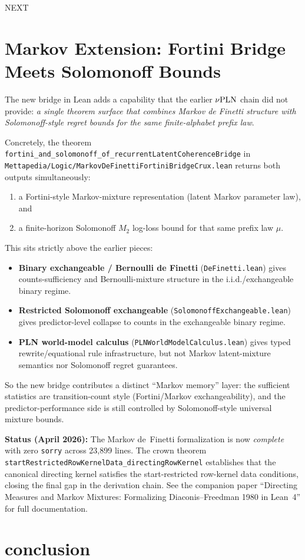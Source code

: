 \documentclass[]{article}
\begin{document}
NEXT

\section{Markov Extension: Fortini Bridge Meets Solomonoff Bounds}
\label{sec:markov-fortini-solomonoff}

The new bridge in Lean adds a capability that the earlier $\nu\textup{PLN}$ chain did not provide:
\emph{a single theorem surface that combines Markov de Finetti structure
with Solomonoff-style regret bounds for the same finite-alphabet prefix law}.

Concretely, the theorem
\texttt{fortini\_and\_solomonoff\_of\_recurrentLatentCoherenceBridge}
in \texttt{Mettapedia/Logic/MarkovDeFinettiFortiniBridgeCrux.lean}
returns both outputs simultaneously:
\begin{enumerate}
\item a Fortini-style Markov-mixture representation (latent Markov parameter law), and
\item a finite-horizon Solomonoff $M_2$ log-loss bound
for that same prefix law $\mu$.
\end{enumerate}

This sits strictly above the earlier pieces:
\begin{itemize}
\item \textbf{Binary exchangeable / Bernoulli de Finetti} (\texttt{DeFinetti.lean}) gives
counts-sufficiency and Bernoulli-mixture structure in the i.i.d./exchangeable binary regime.
\item \textbf{Restricted Solomonoff exchangeable} (\texttt{SolomonoffExchangeable.lean}) gives
predictor-level collapse to counts in the exchangeable binary regime.
\item \textbf{PLN world-model calculus} (\texttt{PLNWorldModelCalculus.lean}) gives
typed rewrite/equational rule infrastructure, but not Markov latent-mixture semantics
nor Solomonoff regret guarantees.
\end{itemize}

So the new bridge contributes a distinct ``Markov memory'' layer:
the sufficient statistics are transition-count style (Fortini/Markov exchangeability),
and the predictor-performance side is still controlled by Solomonoff-style universal
mixture bounds.

\textbf{Status (April 2026):} The Markov de~Finetti formalization is now
\emph{complete} with zero \texttt{sorry} across 23,899 lines. The crown theorem
\texttt{startRestrictedRowKernelData\_directingRowKernel} establishes that the
canonical directing kernel satisfies the start-restricted row-kernel data
conditions, closing the final gap in the derivation chain. See the companion
paper ``Directing Measures and Markov Mixtures: Formalizing Diaconis--Freedman
1980 in Lean~4'' for full documentation.

\section{conclusion}



\end{document}
